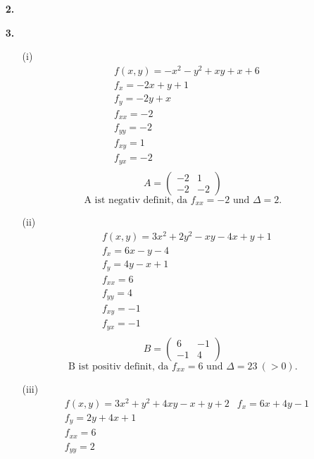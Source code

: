 \documentclass[a4paper,11pt]{article}
\begin{document}
\begin{enumerate}
        \item[\textbf{2.}]
        \todo
        \item[\textbf{3.}]
        \begin{enumerate}
                \item[(i)]
        \begin{align*}
        &f(x,y) = -x^2-y^2 +xy +x +6 \\
        &f_x = -2x +y +1 \\
        &f_y = -2y + x \\
        &f_{xx} = -2 \\
        &f_{yy} = -2 \\
        &f_{xy} = 1 \\
        &f_{yx} = -2 \\         
        \end{align*}
        $$ A = \begin{pmatrix}
        -2 & 1\\
        -2 & -2
        \end{pmatrix} $$
        $$ \text{A ist negativ definit, da } f_{xx} = -2 \text{ und } \Delta = 2. $$
        \item[(ii)]
        \begin{align*}
        &f(x,y) = 3x^2 +2y^2 -xy - 4x +y +1 \\
        &f_x = 6x -y -4 \\
        &f_y = 4y -x +1 \\
        &f_{xx} = 6 \\
        &f_{yy} = 4 \\
        &f_{xy} = -1 \\
        &f_{yx} = -1 \\  
        \end{align*}
        $$ B =\begin{pmatrix}
        6 & -1 \\
        -1 & 4	
        \end{pmatrix} $$
        $$ \text{B ist positiv definit, da } f_{xx} = 6 \text{ und } \Delta = 23 \ (> 0).$$ 
        \item[(iii)]
        \begin{align*}
        &f(x,y) = 3x^2+y^2+4xy -x +y +2
        &f_x = 6x+4y-1 \\
        &f_y = 2y +4x +1 \\
        &f_{xx} = 6 \\
        &f_{yy} = 2 \\

\end{align*}
\end{enumerate}
\end{enumerate}
\end{document}
